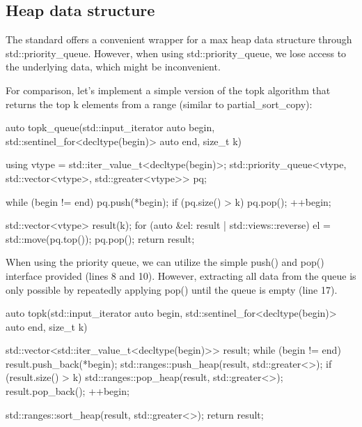 \subsection{Heap data structure}

The standard offers a convenient wrapper for a max heap data structure through std::priority\_queue. However, when using std::priority\_queue, we lose access to the underlying data, which might be inconvenient.




For comparison, let’s implement a simple version of the topk algorithm that returns the top k elements from a range (similar to partial\_sort\_copy):

\begin{box-note}
\begin{cppcode}
auto topk_queue(std::input_iterator auto begin, std::sentinel_for<decltype(begin)> auto end, 
                size_t k) {

    using vtype = std::iter_value_t<decltype(begin)>;
    std::priority_queue<vtype, std::vector<vtype>, std::greater<vtype>> pq;

    while (begin != end) {
        pq.push(*begin);
        if (pq.size() > k)
            pq.pop();
        ++begin;
    }

    std::vector<vtype> result(k);
    for (auto &el: result | std::views::reverse) {
        el = std::move(pq.top());
        pq.pop();
    }
    return result;    
}
\end{cppcode}
\end{box-note}

When using the priority queue, we can utilize the simple push() and pop() interface provided (lines 8 and 10). However, extracting all data from the queue is only possible by repeatedly applying pop() until the queue is empty (line 17).

\begin{box-note}
\begin{cppcode}
auto topk(std::input_iterator auto begin, std::sentinel_for<decltype(begin)> auto end, 
          size_t k) {
          
    std::vector<std::iter_value_t<decltype(begin)>> result;
    while (begin != end) {
        result.push_back(*begin);
        std::ranges::push_heap(result, std::greater<>{});
        if (result.size() > k) {
            std::ranges::pop_heap(result, std::greater<>{});
            result.pop_back();
        }
        ++begin;
    }
    
    std::ranges::sort_heap(result, std::greater<>{});
    return result;    
}
\end{cppcode}
\end{box-note}

